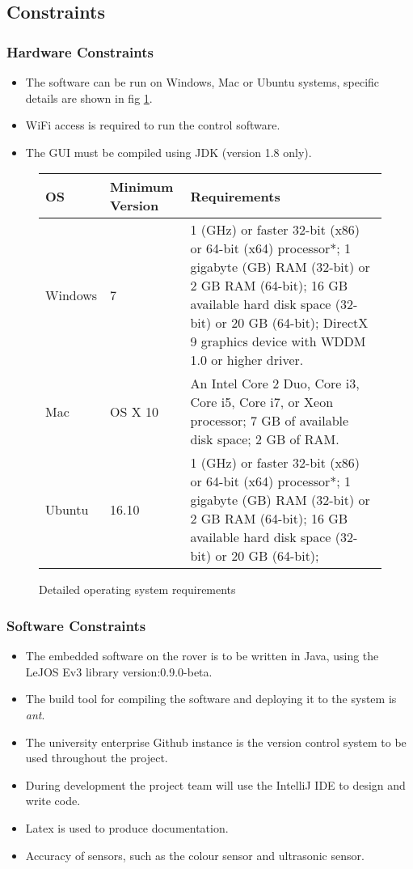 \subsection{Constraints}
\subsubsection*{Hardware Constraints}
\begin{itemize}
\item The software can be run on Windows, Mac or Ubuntu systems, specific details are shown in fig \ref{fig:tab Os Requirements}. 
\item  WiFi access is required to run the control software. 
\item The GUI must be compiled using JDK (version 1.8 only).
\end{itemize}	

	
\begin{figure}
	\centering
	\begin{tabular}{|p{1.5cm}|p{2cm}|p{7cm}|}
		\hline 
		\textbf{OS} &\textbf{Minimum Version} & \textbf{Requirements} \\ 
		\hline 
		Windows & 7 & 1 (GHz) or faster 32-bit (x86) or 64-bit (x64) processor*;
		1 gigabyte (GB) RAM (32-bit) or 2 GB RAM (64-bit);
		16 GB available hard disk space (32-bit) or 20 GB (64-bit);
		DirectX 9 graphics device with WDDM 1.0 or higher driver. \\ 
		\hline 
		Mac & OS X 10 & An Intel Core 2 Duo, Core i3, Core i5, Core i7, or Xeon processor;
		7 GB of available disk space;
		2 GB of RAM. \\ 
		\hline 
		Ubuntu & 16.10 & 1 (GHz) or faster 32-bit (x86) or 64-bit (x64) processor*;
		1 gigabyte (GB) RAM (32-bit) or 2 GB RAM (64-bit);
		16 GB available hard disk space (32-bit) or 20 GB (64-bit); \\
		\hline 
	\end{tabular} 
	\caption{Detailed operating system requirements}
	\label{fig:tab Os Requirements}
\end{figure}

\subsubsection*{Software Constraints}
\begin{itemize}
\item The embedded software on the rover is to be written in Java, using the LeJOS Ev3 library version:0.9.0-beta.
\item The build tool for compiling the software and deploying it to the system is \textit{ant}.
\item The university enterprise Github instance is the version control system to be used throughout the project.
\item During development the project team will use the IntelliJ IDE to design and write code. 
\item Latex is used to produce documentation.
\item Accuracy of sensors, such as the colour sensor and ultrasonic sensor.
\end{itemize}	



	





